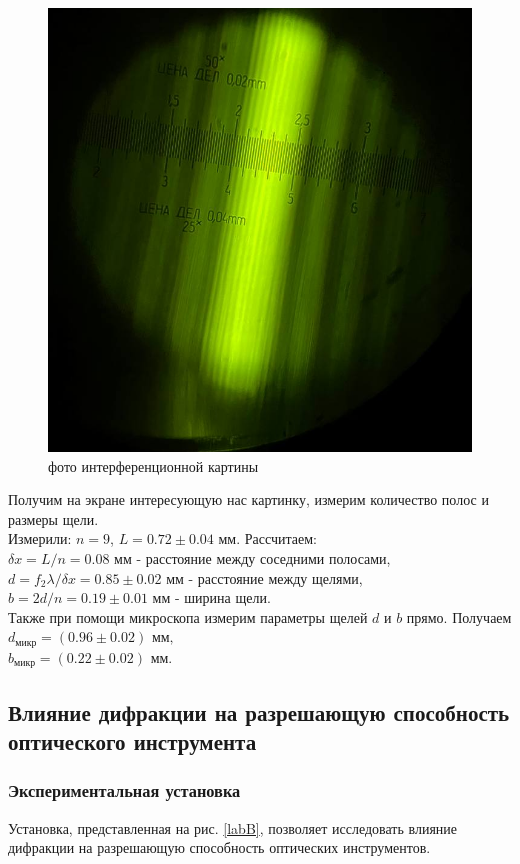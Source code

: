 \documentclass[a4paper, 12pt]{article}%
\begin{document}
 	\begin{figure}[H]
 		\centering
 		\includegraphics[width=0.6\linewidth]{screenshot001}
 		\caption{фото интерференционной картины}
 		\label{fig:screenshot001}
 	\end{figure}
 	
 	Получим на экране интересующую нас картинку, измерим количество полос и размеры щели.\\
 	Измерили: $n = 9$, $L = 0.72\pm 0.04$ мм.
 	Рассчитаем:\\ $\delta x = L / n = 0.08$ мм - расстояние между соседними полосами, \\$d = f_2 \lambda / \delta x = 0.85 \pm 0.02$ мм - расстояние между щелями, \\$b = 2d / n = 0.19\pm 0.01$ мм - ширина щели.\\
 	Также при помощи микроскопа измерим параметры щелей $ d $ и $ b $ прямо. Получаем\\
 	$d_\text{микр} = (0.96 \pm 0.02) \text{ мм}, $\\
 	$b_\text{микр} = (0.22 \pm 0.02) \text{ мм}.$\\
 	\subsection{Влияние дифракции на разрешающую способность оптического инструмента}
 	
 	\subsubsection{Экспериментальная установка}
 	
 	Установка, представленная на рис. \ref{labB}, позволяет исследовать влияние дифракции на разрешающую способность оптических инструментов.
 	
\end{document}
